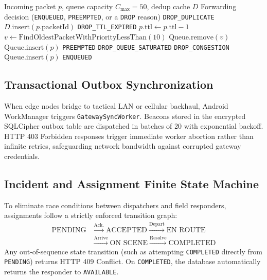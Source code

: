 \documentclass[conference,a4paper]{IEEEtran}
\begin{document}
\begin{algorithm}[htbp]
\caption{Priority-Preemptive Mesh Forwarding}
\label{alg:meshrouter}
\begin{algorithmic}[1]
\REQUIRE Incoming packet $p$, queue capacity $C_{\text{max}} = 50$, dedup cache $D$
\ENSURE Forwarding decision (\texttt{ENQUEUED}, \texttt{PREEMPTED}, or a \texttt{DROP} reason)
    \RETURN \texttt{DROP\_DUPLICATE}
\ENDIF
\STATE $D.\text{insert}(p.\text{packetId})$
    \RETURN \texttt{DROP\_TTL\_EXPIRED}
\ENDIF
\STATE $p.\text{ttl} \leftarrow p.\text{ttl} - 1$
        \STATE $v \leftarrow \text{FindOldestPacketWithPriorityLessThan}(10)$
            \STATE $\text{Queue}.\text{remove}(v)$
            \STATE $\text{Queue}.\text{insert}(p)$
            \RETURN \texttt{PREEMPTED}
        \ELSE
            \RETURN \texttt{DROP\_QUEUE\_SATURATED}
        \ENDIF
    \ELSE
        \RETURN \texttt{DROP\_CONGESTION}
    \ENDIF
\ELSE
    \STATE $\text{Queue}.\text{insert}(p)$
    \RETURN \texttt{ENQUEUED}
\ENDIF
\end{algorithmic}
\end{algorithm}

\subsection{Transactional Outbox Synchronization}
When edge nodes bridge to tactical LAN or cellular backhaul, Android WorkManager \cite{11} triggers \texttt{GatewaySyncWorker}. Beacons stored in the encrypted SQLCipher outbox table are dispatched in batches of 20 with exponential backoff. HTTP 403 Forbidden responses trigger immediate worker abortion rather than infinite retries, safeguarding network bandwidth against corrupted gateway credentials.

\subsection{Incident and Assignment Finite State Machine}
To eliminate race conditions between dispatchers and field responders, assignments follow a strictly enforced transition graph:
\begin{equation*}
\begin{split}
\text{PENDING} &\xrightarrow{\text{Ack.}} \text{ACCEPTED} \xrightarrow{\text{Depart}} \text{EN ROUTE}\\
&\xrightarrow{\text{Arrive}} \text{ON SCENE} \xrightarrow{\text{Resolve}} \text{COMPLETED}
\end{split}
\end{equation*}
Any out-of-sequence state transition (such as attempting \texttt{COMPLETED} directly from \texttt{PENDING}) returns HTTP 409 Conflict. On \texttt{COMPLETED}, the database automatically returns the responder to \texttt{AVAILABLE}.
\end{document}

